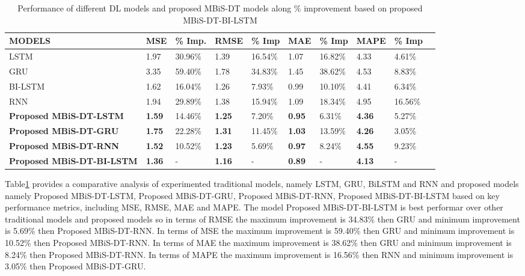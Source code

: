 \documentclass[sn-mathphys,Numbered]{sn-jnl}
\theoremstyle{thmstyleone}
\theoremstyle{thmstyletwo}
\theoremstyle{thmstylethree}
\begin{document}
\begin{table}[ht!]
\centering
\caption{Performance of different DL models and proposed MBiS-DT models along \% improvement based on proposed MBiS-DT-BI-LSTM }
\label{tab:Performance_of_different DL}
\begin{tabular}{p{}lllllllll}
\hline
\textbf{MODELS} & \textbf{MSE} & \textbf{\% Imp.} & \textbf{RMSE} & \textbf{\% Imp} & \textbf{MAE} & \textbf{\% Imp} & \textbf{MAPE} & \textbf{\% Imp} \\ \hline
LSTM & 1.97 &30.96\% & 1.39 &16.54\% & 1.07 &16.82\% & 4.33 &4.61\% \\
GRU & 3.35 &59.40\% & 1.78 &34.83\% & 1.45 & 38.62\% & 4.53 &8.83\% \\
BI-LSTM & 1.62 &16.04\% & 1.26 &7.93\% & 0.99 &10.10\% & 4.41 &6.34\% \\
RNN & 1.94 &29.89\% & 1.38 &15.94\% & 1.09 &18.34\% & 4.95&16.56\% \\
\textbf{Proposed MBiS-DT-LSTM} & \textbf{1.59} &14.46\% & \textbf{1.25} &7.20\% & \textbf{0.95} &6.31\% & \textbf{4.36} &5.27\% \\
\textbf{Proposed MBiS-DT-GRU} & \textbf{1.75} &22.28\% & \textbf{1.31} &11.45\% & \textbf{1.03} & 13.59\% & \textbf{4.26} &3.05\% \\
\textbf{Proposed MBiS-DT-RNN} & \textbf{1.52} &10.52\% & \textbf{1.23} &5.69\% & \textbf{0.97} &8.24\% & \textbf{4.55} &9.23\% \\
\textbf{Proposed MBiS-DT-BI-LSTM} & \textbf{1.36} & - & \textbf{1.16} &- & \textbf{0.89} & - & \textbf{4.13} & - \\
\hline
\end{tabular}
\end{table}


Table\ref{tab:Performance_of_different DL} provides a comparative analysis of experimented  traditional models, namely LSTM, GRU, BiLSTM and RNN and proposed models namely Proposed MBiS-DT-LSTM,   Proposed MBiS-DT-GRU,  Proposed MBiS-DT-RNN,  Proposed MBiS-DT-BI-LSTM based on key performance metrics, including MSE,  RMSE,  MAE  and MAPE.  The model Proposed MBiS-DT-BI-LSTM is best performar over other traditional models and proposed models so in terms of RMSE the maximum improvement is 34.83\%  then GRU and minimum improvement is 5.69\% then Proposed MBiS-DT-RNN.  In terms of MSE the maximum improvement is 59.40\%  then GRU and minimum improvement is 10.52\% then Proposed MBiS-DT-RNN.  In terms of MAE the maximum improvement is 38.62\%  then GRU and minimum improvement is 8.24\% then Proposed MBiS-DT-RNN.  In terms of MAPE the maximum improvement is 16.56\%  then RNN and minimum improvement is 3.05\% then Proposed MBiS-DT-GRU.
\end{document}
